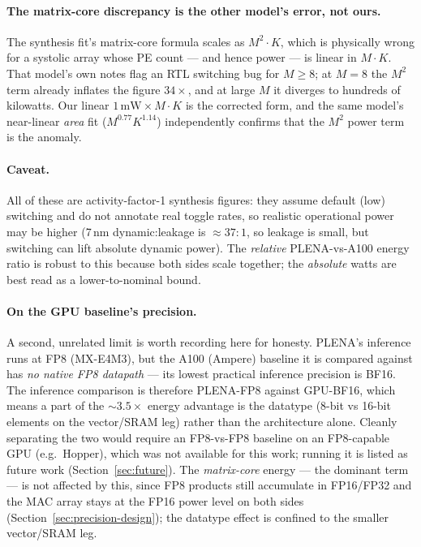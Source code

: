\documentclass[11pt]{report}
\begin{document}
\paragraph{The matrix-core discrepancy is the other model's error, not
ours.} The synthesis fit's matrix-core formula scales as $M^2\!\cdot\!K$,
which is physically wrong for a systolic array whose PE count --- and hence
power --- is linear in $M\!\cdot\!K$. That model's own notes flag an RTL
switching bug for $M\ge 8$; at $M=8$ the $M^2$ term already inflates the
figure $34\times$, and at large $M$ it diverges to hundreds of kilowatts.
Our linear $1\,\text{mW}\times M\!\cdot\!K$ is the corrected form, and the
same model's near-linear \emph{area} fit ($M^{0.77}K^{1.14}$) independently
confirms that the $M^2$ power term is the anomaly.

\paragraph{Caveat.} All of these are activity-factor-1 synthesis figures:
they assume default (low) switching and do not annotate real toggle rates,
so realistic operational power may be higher (7\,nm dynamic:leakage is
${\approx}37{:}1$, so leakage is small, but switching can lift absolute
dynamic power). The \emph{relative} PLENA-vs-A100 energy ratio is robust to
this because both sides scale together; the \emph{absolute} watts are best
read as a lower-to-nominal bound.

\paragraph{On the GPU baseline's precision.} A second, unrelated limit is
worth recording here for honesty. PLENA's inference runs at FP8 (MX-E4M3),
but the A100 (Ampere) baseline it is compared against has \emph{no native
FP8 datapath} --- its lowest practical inference precision is BF16. The
inference comparison is therefore PLENA-FP8 against GPU-BF16, which means a
part of the ${\sim}3.5\times$ energy advantage is the datatype (8-bit vs
16-bit elements on the vector/SRAM leg) rather than the architecture alone.
Cleanly separating the two would require an FP8-vs-FP8 baseline on an
FP8-capable GPU (e.g.\ Hopper), which was not available for this work;
running it is listed as future work (Section~\ref{sec:future}). The
\emph{matrix-core} energy --- the dominant term --- is not affected by this,
since FP8 products still accumulate in FP16/FP32 and the MAC array stays at
the FP16 power level on both sides (Section~\ref{sec:precision-design}); the
datatype effect is confined to the smaller vector/SRAM leg.
\end{document}
